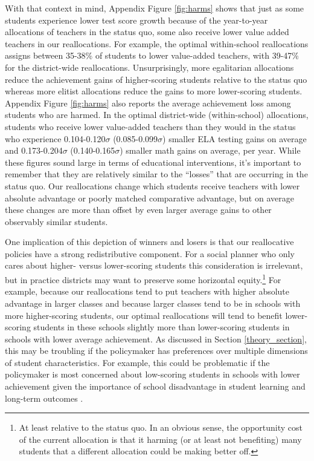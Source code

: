 \documentclass[12pt]{article}
\theoremstyle{definition}
\theoremstyle{definition}
\theoremstyle{definition}
\theoremstyle{definition}
\begin{document}
With that context in mind, Appendix Figure \ref{fig:harms} shows that just as some students experience lower test score growth because of the year-to-year allocations of teachers in the status quo, some also receive lower value added teachers in our reallocations. For example, the optimal within-school reallocations assigns between 35-38\% of students to lower value-added teachers, with 39-47\% for the district-wide reallocations. Unsurprisingly, more egalitarian allocations reduce the achievement gains of higher-scoring students relative to the status quo whereas more elitist allocations reduce the gains to more lower-scoring students. Appendix Figure \ref{fig:harms} also reports the average achievement loss among students who are harmed. In the optimal district-wide (within-school) allocations, students who receive lower value-added teachers than they would in the status who experience 0.104-0.120$\sigma$ (0.085-0.099$\sigma$) smaller ELA testing gains on average and 0.173-0.204$\sigma$ (0.140-0.165$\sigma$) smaller math gains on average, per year. While these figures sound large in terms of educational interventions, it's important to remember that they are relatively similar to the ``losses'' that are occurring in the status quo. Our reallocations change which students receive teachers with lower absolute advantage or poorly matched comparative advantage, but on average these changes are more than offset by even larger average gains to other observably similar students.


One implication of this depiction of winners and losers is that our reallocative policies have a strong redistributive component. For a social planner who only cares about higher- versus lower-scoring students this consideration is irrelevant, but in practice districts may want to preserve some horizontal equity.\footnote{At least relative to the status quo. In an obvious sense, the opportunity cost of the current allocation is that it harming (or at least not benefiting) many students that a different allocation could be making better off.} For example, because our reallocations tend to put teachers with higher absolute advantage in larger classes and because larger classes  tend to be in schools with more higher-scoring students, our optimal  reallocations will tend to benefit lower-scoring students in these schools slightly more than lower-scoring students in schools with lower average achievement. As discussed in Section \ref{theory_section}, this may be troubling if the policymaker has preferences over multiple dimensions of student characteristics. For example, this could be problematic if the policymaker is most concerned about low-scoring students in schools with lower achievement given the importance of school disadvantage in student learning and long-term outcomes \citep[e.g., see][]{}.
\end{document}
